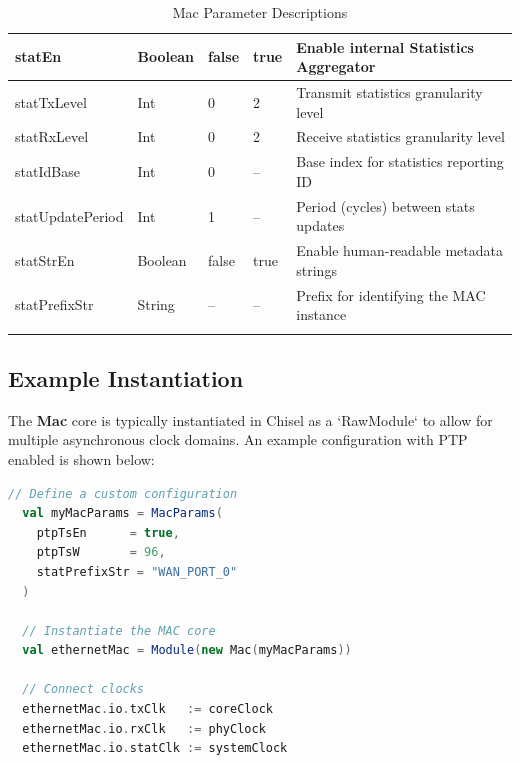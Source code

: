\begin{longtable}[H]{
    | p{}
    | p{}
    | p{}
    | p{}
    | p{} |
  }
  statEn        & Boolean & false   & true    & Enable internal Statistics Aggregator \\ \hline
  statTxLevel   & Int     & 0       & 2       & Transmit statistics granularity level \\ \hline
  statRxLevel   & Int     & 0       & 2       & Receive statistics granularity level \\ \hline
  statIdBase    & Int     & 0       & --      & Base index for statistics reporting ID \\ \hline
  statUpdatePeriod & Int  & 1       & --      & Period (cycles) between stats updates \\ \hline
  statStrEn     & Boolean & false   & true    & Enable human-readable metadata strings \\ \hline
  statPrefixStr & String  & --      & --      & Prefix for identifying the MAC instance \\ \hline

  \caption{Mac Parameter Descriptions}\label{table:params}
\end{longtable}

\subsection{Example Instantiation}

The \textbf{Mac} core is typically instantiated in Chisel as a `RawModule` to allow for multiple asynchronous clock domains. An example configuration with PTP enabled is shown below:

\begin{lstlisting}[language=Scala]
  // Define a custom configuration
  val myMacParams = MacParams(
    ptpTsEn      = true,
    ptpTsW       = 96,
    statPrefixStr = "WAN_PORT_0"
  )

  // Instantiate the MAC core
  val ethernetMac = Module(new Mac(myMacParams))
  
  // Connect clocks
  ethernetMac.io.txClk   := coreClock
  ethernetMac.io.rxClk   := phyClock
  ethernetMac.io.statClk := systemClock
\end{lstlisting}